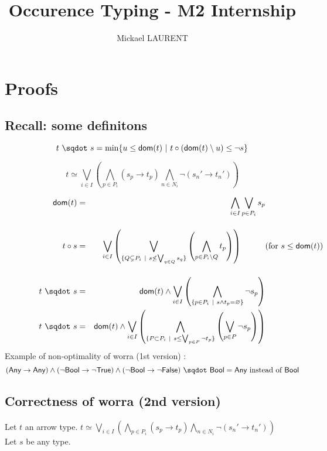 \documentclass[a4paper]{article}%
\title{\vspace{1.5cm}Occurence Typing - M2 Internship}
\author{Mickael LAURENT}
\date{\vspace{-5ex}}
\newcommand{\worra}[2]{#1\mathop{\,\sqdot\,} #2}
\newcommand{\apply}[2]{#1\circ#2}
\newcommand{\dom}[1]{\textsf{dom}(#1)}
\newcommand{\alt}{~|~}
\newcommand{\Any} {\textsf{Any}}%
\newcommand{\Bool} {\textsf{Bool}}
\newcommand{\True} {\textsf{True}}
\newcommand{\False} {\textsf{False}}
\begin{document}
	\maketitle

    \section{Proofs}

    \subsection{Recall: some definitons}

    \[ \worra t s = \min \{ u \leq \dom t \alt \apply t {(\dom t \setminus u)} \leq \neg s \} \]

    \[ t \simeq \bigvee_{i\in I}\left(\bigwedge_{p\in P_i}(s_p\to t_p)\bigwedge_{n\in N_i}\neg(s_n'\to t_n')\right) \]

    \begin{eqnarray*}
        \dom{t}    & = & \bigwedge_{i\in I}\bigvee_{p\in P_i}s_p\\[4mm]
        \apply t s & = & \bigvee_{i\in I}\left(\bigvee_{\{Q\subsetneq P_i\alt s\not\leq\bigvee_{q\in Q}s_q\}}\left(\bigwedge_{p\in P_i\setminus Q}t_p\right)\right)\hspace*{1cm}\makebox[0cm][l]{(for $s\leq\dom{t}$)}\\[4mm]
        \worra t s & = & \dom t \wedge\bigvee_{i\in I}\left(\bigwedge_{\{p\in P_i\alt s\wedge t_p=\varnothing\}}\neg s_p \right)\\
        \worra t s & = & \dom t \wedge\bigvee_{i\in I}\left(\bigwedge_{\{P \subset P_i\alt s \leq \bigvee_{p \in P} \neg t_p\}} \left(\bigvee_{p \in P} \neg s_p \right)\right)
    \end{eqnarray*}
    Example of non-optimality of worra (1st version) :
    \[ \worra {(\Any \rightarrow \Any) \land (\neg \Bool \rightarrow \neg \True) \land (\neg \Bool \rightarrow \neg \False)} \Bool = \Any \text{ instead of } \Bool \]
    \pagebreak

    \subsection{Correctness of worra (2nd version)}
    
    Let $t$ an arrow type. $t \simeq \bigvee_{i\in I}\left(\bigwedge_{p\in P_i}(s_p\to t_p)\bigwedge_{n\in N_i}\neg(s_n'\to t_n')\right)$\\
    Let $s$ be any type.
\end{document}
